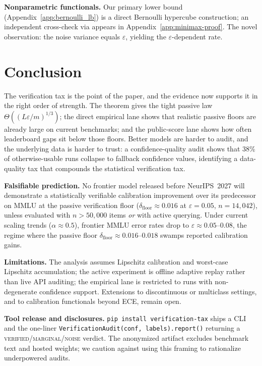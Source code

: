 \documentclass{article}
\newcommand{\Lip}{L}
\newcommand{\errrate}{\varepsilon}
\newcommand{\nsamples}{m}
\newcommand{\scalingexp}{\alpha}
\newcommand{\verfloor}{\delta_{\mathrm{floor}}}
\theoremstyle{definition}
\begin{document}
\textbf{Nonparametric functionals.} Our primary lower bound (Appendix~\ref{app:bernoulli_lb}) is a direct Bernoulli hypercube construction; an independent cross-check via \citet{lepski1999estimation} appears in Appendix~\ref{app:minimax-proof}. The novel observation: the noise variance equals $\errrate$, yielding the $\errrate$-dependent rate.

\section{Conclusion}
\label{sec:conclusion}

The verification tax is the point of the paper, and the evidence now supports it in the right order of strength. The theorem gives the tight passive law $\Theta((\Lip\errrate/\nsamples)^{1/3})$; the direct empirical lane shows that realistic passive floors are already large on current benchmarks; and the public-score lane shows how often leaderboard gaps sit below those floors. Better models are harder to audit, and the underlying data is harder to trust: a confidence-quality audit shows that 38\% of otherwise-usable runs collapse to fallback confidence values, identifying a data-quality tax that compounds the statistical verification tax.

\textbf{Falsifiable prediction.} No frontier model released before NeurIPS~2027 will demonstrate a statistically verifiable calibration improvement over its predecessor on MMLU at the passive verification floor ($\verfloor \approx 0.016$ at $\errrate{=}0.05$, $n{=}14{,}042$), unless evaluated with $n > 50{,}000$ items \emph{or} with active querying. Under current scaling trends ($\scalingexp \approx 0.5$), frontier MMLU error rates drop to $\errrate \approx 0.05$--$0.08$, the regime where the passive floor $\verfloor \approx 0.016$--$0.018$ swamps reported calibration gains.

\textbf{Limitations.} The analysis assumes Lipschitz calibration and worst-case Lipschitz accumulation; the active experiment is offline adaptive replay rather than live API auditing; the empirical lane is restricted to runs with non-degenerate confidence support. Extensions to discontinuous or multiclass settings, and to calibration functionals beyond ECE, remain open.

\textbf{Tool release and disclosures.} \texttt{pip install verification-tax} ships a CLI and the one-liner \texttt{VerificationAudit(conf, labels).report()} returning a \textsc{verified}/\textsc{marginal}/\textsc{noise} verdict. The anonymized artifact excludes benchmark text and hosted weights; we caution against using this framing to rationalize underpowered audits.
\end{document}
